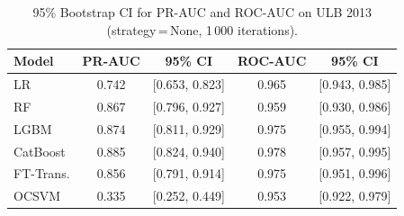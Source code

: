 \begin{table}[H]
\centering
\caption{95\% Bootstrap CI for PR-AUC and ROC-AUC on ULB 2013 (strategy\,=\,None, 1\,000 iterations).}
\label{tab:ci_ulb}
\begin{tabular}{l c c c c}
\toprule
Model & PR-AUC & 95\% CI & ROC-AUC & 95\% CI \\
\midrule
LR         & 0.742 & [0.653, 0.823] & 0.965 & [0.943, 0.985] \\
RF         & 0.867 & [0.796, 0.927] & 0.959 & [0.930, 0.986] \\
LGBM       & 0.874 & [0.811, 0.929] & 0.975 & [0.955, 0.994] \\
CatBoost   & 0.885 & [0.824, 0.940] & 0.978 & [0.957, 0.995] \\
FT-Trans.  & 0.856 & [0.791, 0.914] & 0.975 & [0.951, 0.996] \\
OCSVM      & 0.335 & [0.252, 0.449] & 0.953 & [0.922, 0.979] \\
\bottomrule
\end{tabular}
\end{table}